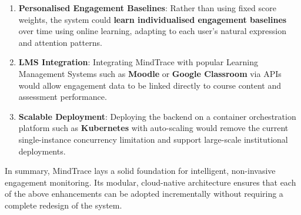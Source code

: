 \begin{enumerate}
    \item \textbf{Personalised Engagement Baselines}: Rather than using
          fixed score weights, the system could \textbf{learn individualised
          engagement baselines} over time using online learning, adapting
          to each user's natural expression and attention patterns.

    \item \textbf{LMS Integration}: Integrating MindTrace with popular
          Learning Management Systems such as \textbf{Moodle} or
          \textbf{Google Classroom} via APIs would allow engagement data
          to be linked directly to course content and assessment performance.

    \item \textbf{Scalable Deployment}: Deploying the backend on a
          container orchestration platform such as \textbf{Kubernetes}
          with auto-scaling would remove the current single-instance
          concurrency limitation and support large-scale institutional
          deployments.
\end{enumerate}

In summary, MindTrace lays a solid foundation for intelligent, non-invasive
engagement monitoring. Its modular, cloud-native architecture ensures that
each of the above enhancements can be adopted incrementally without
requiring a complete redesign of the system.
